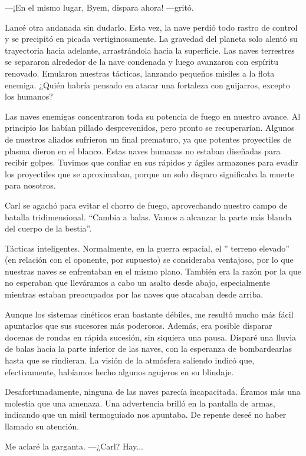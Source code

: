 —¡En el mismo lugar, Byem, dispara ahora! —gritó.

Lancé otra andanada sin dudarlo. Esta vez, la nave perdió todo rastro de control y se precipitó en picada vertiginosamente. La gravedad del planeta solo alentó su trayectoria hacia adelante, arrastrándola hacia la superficie. Las naves terrestres se separaron alrededor de la nave condenada y luego avanzaron con espíritu renovado. Emularon nuestras tácticas, lanzando pequeños misiles a la flota enemiga. ¿Quién habría pensado en atacar una fortaleza con guijarros, excepto los humanos?

Las naves enemigas concentraron toda su potencia de fuego en nuestro avance. Al principio los habían pillado desprevenidos, pero pronto se recuperarían. Algunos de nuestros aliados sufrieron un final prematuro, ya que potentes proyectiles de plasma dieron en el blanco. Estas naves humanas no estaban diseñadas para recibir golpes. Tuvimos que confiar en sus rápidos y ágiles armazones para evadir los proyectiles que se aproximaban, porque un solo disparo significaba la muerte para nosotros.

Carl se agachó para evitar el chorro de fuego, aprovechando nuestro campo de batalla tridimensional. ``Cambia a balas. Vamos a alcanzar la parte más blanda del cuerpo de la bestia''.

Tácticas inteligentes. Normalmente, en la guerra espacial, el ''
terreno elevado''
 (en relación con el oponente, por supuesto) se consideraba ventajoso, por lo que nuestras naves se enfrentaban en el mismo plano. También era la razón por la que no esperaban que lleváramos a cabo un asalto desde abajo, especialmente mientras estaban preocupados por las naves que atacaban desde arriba.

Aunque los sistemas cinéticos eran bastante débiles, me resultó mucho más fácil apuntarlos que sus sucesores más poderosos. Además, era posible disparar docenas de rondas en rápida sucesión, sin siquiera una pausa. Disparé una lluvia de balas hacia la parte inferior de las naves, con la esperanza de bombardearlas hasta que se rindieran. La visión de la atmósfera saliendo indicó que, efectivamente, habíamos hecho algunos agujeros en su blindaje.

Desafortunadamente, ninguna de las naves parecía incapacitada. Éramos más una molestia que una amenaza. Una advertencia brilló en la pantalla de armas, indicando que un misil termoguiado nos apuntaba. De repente deseé no haber llamado su atención.

Me aclaré la garganta. —¿Carl? Hay...

